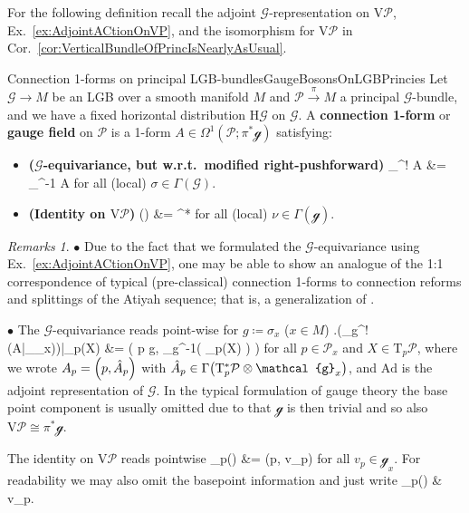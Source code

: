 \documentclass[a4paper,oneside,11pt,bibliography=totoc]{scrartcl}
\DeclareMathOperator{\sAd}{\mathKel{A\mkern-5.5mu d}}
\def\bas#1\eas{\begin{align*}#1\end{align*}}
\theoremstyle{plain}
\theoremstyle{remark}
\newtheorem{remark}[theorem]{Remarks}
\theoremstyle{definition}
\begin{document}
For the following definition recall the adjoint $\mathcal{G}$-representation on $\mathrm{V}\mathcal{P}$, Ex.\ \ref{ex:AdjointACtionOnVP}, and the isomorphism for $\mathrm{V}\mathcal{P}$ in Cor.\ \ref{cor:VerticalBundleOfPrincIsNearlyAsUsual}.

\begin{definitions}{Connection 1-forms on principal LGB-bundles}{GaugeBosonsOnLGBPrincies}
Let $\mathcal{G} \to M$ be an LGB over a smooth manifold $M$ and $\mathcal{P} \stackrel{\pi}{\to} M$ a principal $\mathcal{G}$-bundle, and we have a fixed horizontal distribution $\mathrm{H}\mathcal{G}$ on $\mathcal{G}$. A \textbf{connection 1-form} or \textbf{gauge field} on $\mathcal{P}$ is a 1-form $A \in \Omega^1(\mathcal{P}; \pi^*\mathcal{g})$ satisfying:
\begin{itemize}
	\item \textbf{($\mathcal{G}$-equivariance, but w.r.t.\ modified right-pushforward)}
		\bas 
			\mathcal{r}_\sigma^! A
			&=
			\sAd_{\sigma^{-1}} \circ A
		\eas
	for all (local) $\sigma \in \Gamma(\mathcal{G})$.
	\item \textbf{(Identity on $\mathrm{V}\mathcal{P}$)}
	\bas
	A\mleft(\widetilde{\nu}\mright)
	&=
	\pi^*\nu
	\eas
	for all (local) $\nu \in \Gamma(\mathcal{g})$.
\end{itemize}
\end{definitions}

\begin{remark}
\leavevmode\newline
\indent $\bullet$ Due to the fact that we formulated the $\mathcal{G}$-equivariance using Ex.\ \ref{ex:AdjointACtionOnVP}, one may be able to show an analogue of the 1:1 correspondence of typical (pre-classical) connection 1-forms to connection reforms and splittings of the Atiyah sequence; that is, a generalization of \cite[\S 3.2, page 90 ff.]{mackenzieGeneralTheory}.

$\bullet$ The $\mathcal{G}$-equivariance reads point-wise for $g \coloneqq \sigma_x$ ($x\in M$)
\bas
\mleft.\mleft(_g^! \mleft(A|_{_x}\mright)\mright)\mright|_{p}(X)
&=
\mleft(
	p \cdot g, 
	_{g^{-1}}\mleft( _p(X) \mright)
\mright)
\eas
for all $p \in \mathcal{P}_x$ and $X \in \mathrm{T}_p\mathcal{P}$,
where we wrote $A_p = \mleft(p, \hat{A}_p\mright)$ with $\hat{A}_p \in \Gamma\mleft( \mathrm{T}^*_p\mathcal{P} \otimes \mathcal{g}_x \mright)$, and $\mathrm{Ad}$ is the adjoint representation of $\mathcal{G}$. In the typical formulation of gauge theory the base point component is usually omitted due to that $\mathcal{g}$ is then trivial and so also $\mathrm{V}\mathcal{P} \cong \pi^*\mathcal{g}$.

The identity on $\mathrm{V}\mathcal{P}$ reads pointwise
\bas
A_p()
&=
(p, v_p)
\eas
for all $v_p \in \mathcal{g}_x$. For readability we may also omit the basepoint information and just write
\bas
A_p()
&\equiv
v_p.
\eas
\end{remark}
\end{document}
